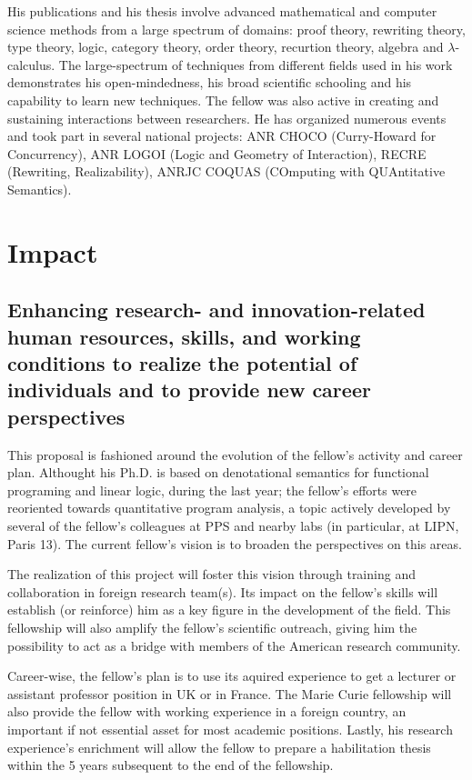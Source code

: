 \documentclass{article}[11pt]
\begin{document}
His publications and his thesis involve advanced mathematical and computer science methods from a large spectrum of domains: proof theory, rewriting theory, type theory, logic, category theory, order theory, recurtion theory, algebra and $\lambda$-calculus. The large-spectrum of techniques from different fields used in his work demonstrates his open-mindedness, his broad scientific schooling and his capability to learn new techniques. The fellow was also active in creating and sustaining interactions between researchers. He has organized numerous events and took part in several national projects: ANR CHOCO (Curry-Howard for Concurrency), ANR LOGOI (Logic and Geometry of Interaction), RECRE (Rewriting, Realizability), ANRJC COQUAS (COmputing with QUAntitative Semantics).




\section{Impact}
\subsection{Enhancing research- and innovation-related human resources, skills, and working conditions to realize the potential of individuals and to provide new career perspectives}

This proposal is fashioned around the evolution of the fellow’s activity and career plan. Althought his Ph.D. is based on denotational semantics for functional programing and linear logic, during the last year; the fellow’s efforts were reoriented towards quantitative program analysis, a topic actively developed by several of the fellow’s colleagues at PPS and nearby labs (in particular, at LIPN, Paris 13). The current fellow’s vision is to broaden the perspectives on this areas. 

The realization of this project will foster this vision through training and collaboration in foreign research team(s). Its impact on the fellow’s skills will establish (or reinforce) him as a key figure in the development of the field. This fellowship will also amplify the fellow’s scientific outreach, giving him the possibility to act as a bridge with members of the American research community.

Career-wise, the fellow’s plan is to use its aquired experience to get a lecturer or assistant professor position in UK or in France. The Marie Curie fellowship will also provide the fellow with working experience in a foreign country, an important if not essential asset for most academic positions.  Lastly, his research experience’s enrichment will allow the fellow to prepare a habilitation thesis within the 5 years subsequent to the end of the fellowship.
\end{document}
